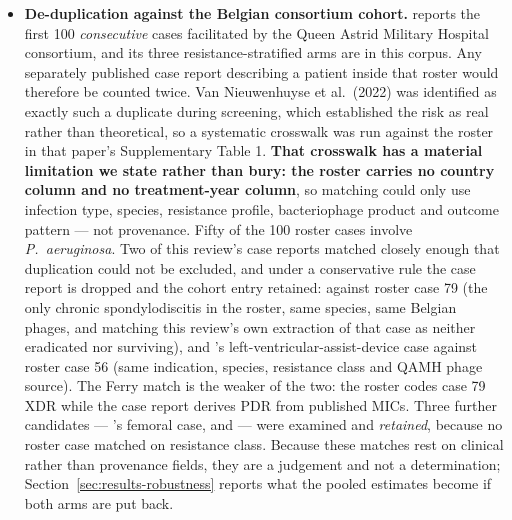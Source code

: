 \begin{itemize}
\item \textbf{De-duplication against the Belgian consortium cohort.} \textcite{Pirnay2024_natmicrobiol} reports the first 100 \emph{consecutive} cases facilitated by the Queen Astrid Military Hospital consortium, and its three resistance-stratified arms are in this corpus. Any separately published case report describing a patient inside that roster would therefore be counted twice. Van Nieuwenhuyse et al.\ (2022) was identified as exactly such a duplicate during screening, which established the risk as real rather than theoretical, so a systematic crosswalk was run against the roster in that paper's Supplementary Table 1. \textbf{That crosswalk has a material limitation we state rather than bury: the roster carries no country column and no treatment-year column}, so matching could only use infection type, species, resistance profile, bacteriophage product and outcome pattern --- not provenance. Fifty of the 100 roster cases involve \textit{P.\ aeruginosa}. Two of this review's case reports matched closely enough that duplication could not be excluded, and under a conservative rule the case report is dropped and the cohort entry retained: \textcite{Ferry2022_natcomms} against roster case 79 (the only chronic spondylodiscitis in the roster, same species, same Belgian phages, and matching this review's own extraction of that case as neither eradicated nor surviving), and \citeauthor{Racenis2023_viruses}'s left-ventricular-assist-device case against roster case 56 (same indication, species, resistance class and QAMH phage source). The Ferry match is the weaker of the two: the roster codes case 79 XDR while the case report derives PDR from published MICs. Three further candidates --- \citeauthor{Racenis2022_frontmed}'s femoral case, \textcite{Blasco2023_frontmed} and \textcite{Tkhilaishvili2020_aac} --- were examined and \emph{retained}, because no roster case matched on resistance class. Because these matches rest on clinical rather than provenance fields, they are a judgement and not a determination; Section~\ref{sec:results-robustness} reports what the pooled estimates become if both arms are put back.

\end{itemize}
